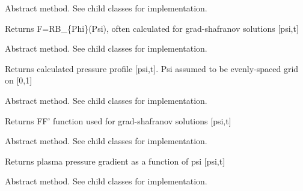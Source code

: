 \documentclass[letterpaper,10pt,english]{sphinxmanual}
\begin{document}
\begin{fulllineitems}
\begin{fulllineitems}
\end{fulllineitems}


\begin{fulllineitems}
\label{eqtools:eqtools.core.Equilibrium.getF}
Abstract method.  See child classes for implementation.

Returns F=RB\_\{Phi\}(Psi), often calculated for grad-shafranov solutions  {[}psi,t{]}

\end{fulllineitems}


\begin{fulllineitems}
\label{eqtools:eqtools.core.Equilibrium.getFluxPres}
Abstract method.  See child classes for implementation.

Returns calculated pressure profile {[}psi,t{]}.
Psi assumed to be evenly-spaced grid on {[}0,1{]}

\end{fulllineitems}


\begin{fulllineitems}
\label{eqtools:eqtools.core.Equilibrium.getFFPrime}
Abstract method.  See child classes for implementation.

Returns FF' function used for grad-shafranov solutions {[}psi,t{]}

\end{fulllineitems}


\begin{fulllineitems}
\label{eqtools:eqtools.core.Equilibrium.getPPrime}
Abstract method.  See child classes for implementation.

Returns plasma pressure gradient as a function of psi {[}psi,t{]}

\end{fulllineitems}


\begin{fulllineitems}
\label{eqtools:eqtools.core.Equilibrium.getElongation}
Abstract method.  See child classes for implementation.


\end{fulllineitems}
\end{fulllineitems}
\end{document}
